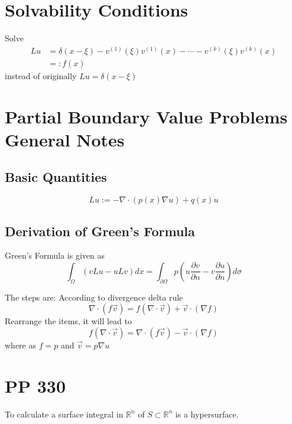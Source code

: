 \documentclass{article}
\numberwithin{equation}{section}
\newcommand{\<}{\langle}
\begin{document}
\section{Solvability Conditions}
Solve \begin{align} L u &=\delta(x-\xi)-v^{(1)}(\xi) v^{(1)}(x)-\cdots-v^{(k)}(\xi) v^{(k)}(x) \\ &=: f(x) \end{align}
instead of originally $L u  = \delta(x- \xi)$
\section{Partial Boundary Value Problems General Notes}
\subsection{Basic Quantities}
\begin{tcolorbox}[colback=blue!10!white]
\begin{equation}
	L u :=-\nabla\cdot (p(x) \nabla u)+q(x) u
\end{equation}
\end{tcolorbox}
\subsection{Derivation of Green's Formula}
\begin{tcolorbox}[colback=green!10!white]
Green's Formula is given as
\begin{equation}
	\int_{\Omega}(v L u-u L v) d x = \int_{\partial \Omega} p\left(u \frac{\partial v}{\partial n}-v \frac{\partial u}{\partial n}\right) d \sigma
\end{equation}
\end{tcolorbox}
The steps are: According to divergence delta rule
\begin{equation}
	\nabla \cdot(f \vec{v})=f(\nabla \cdot \vec{v})+\vec{v} \cdot(\nabla f)
\end{equation}
Rearrange the items, it will lead to
\begin{equation}
	f(\nabla \cdot \vec{v})=\nabla \cdot(f \vec{v})-\vec{v} \cdot(\nabla f)
\end{equation}
where as $f = p$ and $\vec v = p \nabla u$
\section{PP 330}
To calculate a surface integral in $\mathbb{R}^n$ of $S\subset \mathbb{R}^n$ is a hypersurface.
\end{document}
